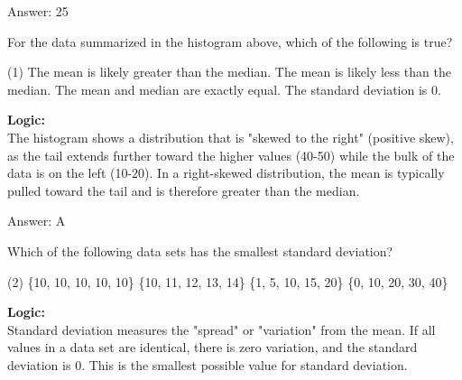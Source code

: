 \documentclass[11pt,paper=a4,answers]{exam}
\begin{document}
\begin{questions}
\begin{solution}
\vspace{30pt}

Answer: \colorbox{yellow!100}{25}
\end{solution}

\vspace{60pt}

\question
\begin{center}
\end{center}
For the data summarized in the histogram above, which of the following is true?
\begin{tasks}(1)
    \task The mean is likely greater than the median.
    \task The mean is likely less than the median.
    \task The mean and median are exactly equal.
    \task The standard deviation is 0.
\end{tasks}

\begin{solution}
\textbf{Logic:} \\
The histogram shows a distribution that is "skewed to the right" (positive skew), as the tail extends further toward the higher values (40-50) while the bulk of the data is on the left (10-20). In a right-skewed distribution, the mean is typically pulled toward the tail and is therefore greater than the median.

\vspace{30pt}

Answer: \colorbox{yellow!100}{A}
\end{solution}

\vspace{60pt}

\question
Which of the following data sets has the smallest standard deviation?
\begin{tasks}(2)
    \task \{10, 10, 10, 10, 10\}
    \task \{10, 11, 12, 13, 14\}
    \task \{1, 5, 10, 15, 20\}
    \task \{0, 10, 20, 30, 40\}
\end{tasks}

\begin{solution}
\textbf{Logic:} \\
Standard deviation measures the "spread" or "variation" from the mean. If all values in a data set are identical, there is zero variation, and the standard deviation is 0. This is the smallest possible value for standard deviation.


\end{solution}
\end{questions}
\end{document}
